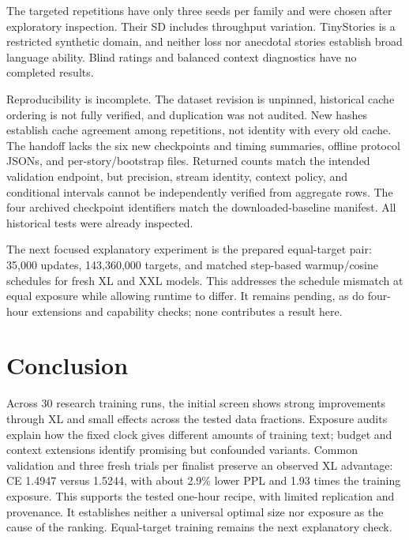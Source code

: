 \documentclass[10pt,twocolumn,letterpaper]{article}
\begin{document}
The targeted repetitions have only three seeds per family and were chosen after
exploratory inspection. Their SD includes throughput variation. TinyStories is
a restricted synthetic domain, and neither loss nor anecdotal stories establish
broad language ability. Blind ratings and balanced context diagnostics have
no completed results.

Reproducibility is incomplete. The dataset revision is unpinned, historical
cache ordering is not fully verified, and duplication was not audited. New
hashes establish cache agreement among repetitions, not identity with every
old cache. The handoff lacks the six new checkpoints and timing summaries,
offline protocol JSONs, and per-story/bootstrap files. Returned counts match
the intended validation endpoint, but precision, stream identity, context policy,
and conditional intervals cannot be independently verified from aggregate rows.
The four archived checkpoint identifiers match the downloaded-baseline manifest.
All historical tests were already inspected.

The next focused explanatory experiment is the prepared equal-target pair:
35,000 updates, 143,360,000 targets, and matched step-based warmup/cosine schedules
for fresh XL and XXL models. This addresses the schedule mismatch at equal
exposure while allowing runtime to differ. It remains pending, as do four-hour
extensions and capability checks; none contributes a result here.

\section{Conclusion}

Across 30 research training runs, the initial screen shows strong improvements
through XL and small effects across the tested data fractions. Exposure audits
explain how the fixed clock gives different amounts of training text; budget
and context extensions identify promising but confounded variants. Common
validation and three fresh trials per finalist preserve an observed XL advantage:
CE 1.4947 versus 1.5244, with about 2.9\% lower PPL and 1.93 times the training
exposure. This supports the tested one-hour recipe, with limited replication and
provenance. It establishes neither a universal optimal size nor exposure as the
cause of the ranking. Equal-target training remains the next explanatory check.


\begingroup\raggedright

\endgroup
\end{document}
